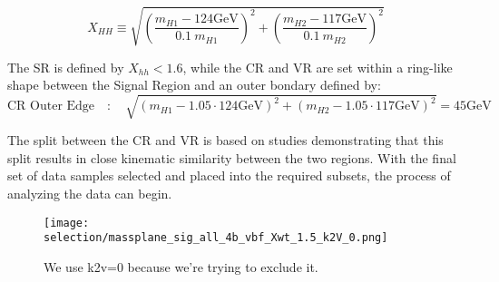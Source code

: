         \begin{equation}
            X_{HH} \equiv \sqrt{\left(\frac{m_{H1} - 124\textrm{GeV}}{0.1 \ m_{H1}}\right)^{2}
                + \left(\frac{m_{H2} - 117\textrm{GeV}}{0.1 \ m_{H2}}\right)^{2}}
            \label{eq:xhh}
        \end{equation}
        
        The SR is defined by $X_{hh} < 1.6$,
            while the CR and VR are set within a ring-like shape between the Signal Region
            and an outer bondary defined by:
        \begin{equation}
            \text{CR\ Outer\ Edge} \quad : \quad \sqrt{ \left(m_{H1} - 1.05 \cdot 124\textrm{GeV}\right)^2
                +  \left(m_{H2} - 1.05 \cdot 117\textrm{GeV}\right)^2 } = 45\textrm{GeV}
            \label{eq:cr_out}
        \end{equation}
        
        The split between the CR and VR is based on studies demonstrating that this split results in
            close kinematic similarity between the two regions.
        With the final set of data samples selected and placed into the required subsets, 
            the process of analyzing the data can begin.

        \begin{figure}[tbh]
            \texttt{[image: selection/massplane\_sig\_all\_4b\_vbf\_Xwt\_1.5\_k2V\_0.png]}
            \caption{
                We use k2v=0 because we're trying to exclude it.\cite{hh4b_2021_int_note}
            }
            \label{fig:region_definition}
        \end{figure}





